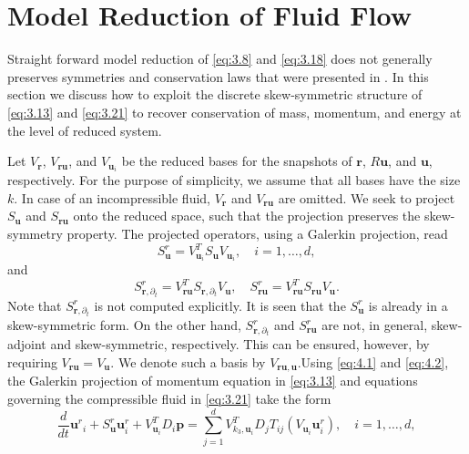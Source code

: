 \section{Model Reduction of Fluid Flow} \label{sec:mor_skew}
Straight forward model reduction of \eqref{eq:3.8} and \eqref{eq:3.18} does not generally preserves symmetries and conservation laws that were presented in . In this section we discuss how to exploit the discrete skew-symmetric structure of \eqref{eq:3.13} and \eqref{eq:3.21} to recover conservation of mass, momentum, and energy at the level of reduced system.

Let $V_{\mathbf r}$, $V_{\mathbf r \mathbf u}$, and $V_{\mathbf u_i}$ be the reduced bases for the snapshots of $\mathbf r$, $R \mathbf u$, and $\mathbf u$, respectively. For the purpose of simplicity, we assume that all bases have the size $k$. In case of an incompressible fluid, $V_{ \mathbf r}$ and $V_{\mathbf r \mathbf u}$ are omitted. We seek to project $S_{\mathbf u}$ and $S_{\mathbf r \mathbf u}$ onto the reduced space, such that the projection preserves the skew-symmetry property. The projected operators, using a Galerkin projection, read
\begin{equation} \label{eq:4.1}
	S^r _{\mathbf u} = V_{ \mathbf u_i}^T S _{\mathbf u} V_{ \mathbf u_i}, \quad i=1,\dots,d,
\end{equation}
and
\begin{equation} \label{eq:4.2}
	S^r_{\mathbf r ,\partial_t} =V_{\mathbf r \mathbf u}^T  S_{\mathbf r ,\partial_t} V_{\mathbf u}, \quad S^r _{\mathbf r \mathbf u} = V_{\mathbf r \mathbf u}^T  S _{\mathbf r \mathbf u} V_{\mathbf u}.
\end{equation}
Note that $S^r_{\mathbf r ,\partial_t}$ is not computed explicitly. It is seen that the $S^r _{\mathbf u}$ is already in a skew-symmetric form. On the other hand, $S^r_{\mathbf r ,\partial_t}$ and $S^r _{\mathbf r \mathbf u}$ are not, in general, skew-adjoint and skew-symmetric, respectively. This can be ensured, however, by requiring $V_{\mathbf r \mathbf u} = V_{\mathbf u}$. We denote such a basis by $V_{\mathbf r \mathbf u, \mathbf u}$.Using \eqref{eq:4.1} and \eqref{eq:4.2}, the Galerkin projection of momentum equation in \eqref{eq:3.13} and equations governing the compressible fluid in \eqref{eq:3.21} take the form
\begin{equation} \label{eq:4.3}
	\frac{d}{dt} {\mathbf u^r}_i + S^r_{\mathbf u} \mathbf u^r_i + V_{\mathbf u_i} ^T D_i \mathbf p = \sum_{j=1}^d V_{k_3, \mathbf u_i}^T D_j T_{ij}(V_{ \mathbf u_i} \mathbf u^r_i), \quad i=1,\dots,d,
\end{equation}

